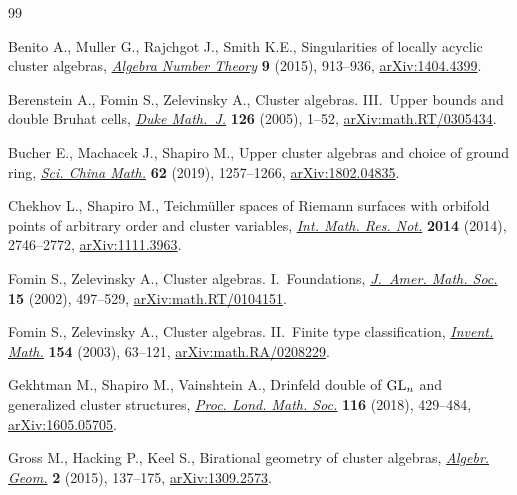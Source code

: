 \begin{thebibliography}{99}
\footnotesize\itemsep=0pt

Benito A., Muller G., Rajchgot J., Smith K.E., Singularities of locally acyclic
 cluster algebras, \href{https://doi.org/10.2140/ant.2015.9.913}{\textit{Algebra Number Theory}} \textbf{9} (2015), 913--936,
 \href{https://arxiv.org/abs/1404.4399}{arXiv:1404.4399}.

Berenstein A., Fomin S., Zelevinsky A., Cluster algebras. {III}.~{U}pper bounds
 and double {B}ruhat cells, \href{https://doi.org/10.1215/S0012-7094-04-12611-9}{\textit{Duke Math.~J.}} \textbf{126} (2005), 1--52,
 \href{https://arxiv.org/abs/math.RT/0305434}{arXiv:math.RT/0305434}.

Bucher E., Machacek J., Shapiro M., Upper cluster algebras and choice of ground
 ring, \href{https://doi.org/10.1007/s11425-018-9486-6}{\textit{Sci. China Math.}} \textbf{62} (2019), 1257--1266,
 \href{https://arxiv.org/abs/1802.04835}{arXiv:1802.04835}.

Chekhov L., Shapiro M., Teichm\"uller spaces of {R}iemann surfaces with
 orbifold points of arbitrary order and cluster variables, \href{https://doi.org/10.1093/imrn/rnt016}{\textit{Int. Math.
 Res. Not.}} \textbf{2014} (2014), 2746--2772, \href{https://arxiv.org/abs/1111.3963}{arXiv:1111.3963}.

Fomin S., Zelevinsky A., Cluster algebras. {I}.~{F}oundations, \href{https://doi.org/10.1090/S0894-0347-01-00385-X}{\textit{J.~Amer.
 Math. Soc.}} \textbf{15} (2002), 497--529, \href{https://arxiv.org/abs/math.RT/0104151}{arXiv:math.RT/0104151}.

Fomin S., Zelevinsky A., Cluster algebras. {II}.~{F}inite type classification,
 \href{https://doi.org/10.1007/s00222-003-0302-y}{\textit{Invent. Math.}} \textbf{154} (2003), 63--121,
 \href{https://arxiv.org/abs/math.RA/0208229}{arXiv:math.RA/0208229}.

Gekhtman M., Shapiro M., Vainshtein A., Drinfeld double of {${\rm GL}_n$} and
 generalized cluster structures, \href{https://doi.org/10.1112/plms.12086}{\textit{Proc. Lond. Math. Soc.}} \textbf{116}
 (2018), 429--484, \href{https://arxiv.org/abs/1605.05705}{arXiv:1605.05705}.

Gross M., Hacking P., Keel S., Birational geometry of cluster algebras,
 \href{https://doi.org/10.14231/AG-2015-007}{\textit{Algebr. Geom.}} \textbf{2} (2015), 137--175, \href{https://arxiv.org/abs/1309.2573}{arXiv:1309.2573}.


\end{thebibliography}
